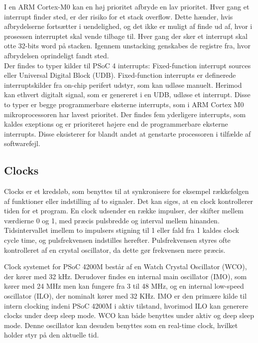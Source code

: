 I en ARM Cortex-M0 kan en høj prioritet afbryde en lav prioritet. Hver gang et interrupt finder sted, er der risiko for et stack overflow. Dette hænder, hvis afbrydelserne fortsætter i uendelighed, og det ikke er muligt af finde ud af, hvor i prosessen interruptet skal vende tilbage til. Hver gang der sker et interrupt skal otte 32-bits word på stacken. Igennem unstacking genskabes de registre fra, hvor afbrydelsen oprindeligt fandt sted.\\
Der findes to typer kilder til PSoC 4 interrupts: Fixed-function interrupt sources eller Universal Digital Block (UDB). Fixed-function interrupts er definerede interruptskilder fra on-chip perifert udstyr, som kan udløse manuelt. Herimod kan ethvert digitalt signal, som er genereret i en UDB, udløse et interrupt. Disse to typer er begge programmerbare eksterne interrupts, som i ARM Cortex M0 mikroprocessoren har lavest prioritet. Der findes fem yderligere interrupts, som kaldes exeptions og er prioriteret højere end de programmerbare eksterne interrupts. Disse eksisterer for blandt andet at genstarte processoren i tilfælde af softwarefejl. \citep{Badiger2016}

\subsection{Clocks}
Clocks er et kredsløb, som benyttes til at synkronisere for eksempel rækkefølgen af funktioner eller indstilling af to signaler. Det kan siges, at en clock kontrollerer tiden for et program. En clock udsender en række impulser, der skifter mellem værdierne 0 og 1, med præcis pulsbredde og interval mellem hinanden. Tidsintervallet imellem to impulsers stigning til 1 eller fald fra 1 kaldes clock cycle time, og pulsfrekvensen indstilles herefter. Pulsfrekvensen styres ofte kontrolleret af en crystal oscillator, da dette gør frekvensen mere præcis. \citep{Tanenbaum2006}

Clock systemet for PSoC 4200M består af en Watch Crystal Oscillator (WCO), der kører med 32 kHz. Derudover findes en internal main oscillator (IMO), som kører med 24 MHz men kan fungere fra 3 til 48 MHz, og en internal low-speed oscillator (ILO), der nominalt kører med 32 KHz. IMO er den primære kilde til intern clocking indeni PSoC 4200M i aktiv tilstand, hvorimod ILO kan generere clocks under deep sleep mode. WCO kan både benyttes under aktiv og deep sleep mode. Denne oscillator kan desuden benyttes som en real-time clock, hvilket holder styr på den aktuelle tid. \citep{Semiconductor20164200M}

